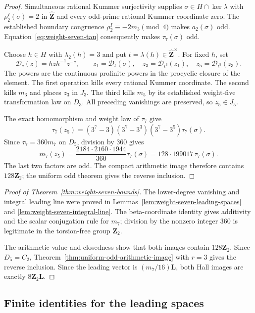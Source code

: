 \begin{proof}
Simultaneous rational Kummer surjectivity supplies
$\sigma\in H\cap\ker\lambda$ with $\rho_2^I(\sigma)=2$ in
$\widehat{\mathbf Z}$ and every odd-prime rational Kummer coordinate
zero. The established boundary congruence
$\rho_2^I\equiv-2m_3\pmod4$ makes $a_2(\sigma)$ odd.
Equation~\eqref{eq:weight-seven-tau} consequently makes
$\tau_7(\sigma)$ odd.

Choose $h\in H$ with $\lambda_2(h)=3$ and put
$t=\lambda(h)\in\widehat{\mathbf Z}^{\times}$. For fixed $h$, set
\[
 \mathcal D_c(z)=hzh^{-1}z^{-c},\qquad
 z_1=\mathcal D_t(\sigma),\quad
 z_3=\mathcal D_{t^3}(z_1),\quad
 z_5=\mathcal D_{t^5}(z_3).
\]
The powers are the continuous profinite powers in the procyclic
closure of the element. The first operation kills every rational
Kummer coordinate. The second kills $m_3$ and places $z_3$ in $J_3$.
The third kills $m_5$ by its established weight-five transformation
law on $D_3$. All preceding vanishings are preserved, so $z_5\in J_5$.

The exact homomorphism and weight law of $\tau_7$ give
\[
 \tau_7(z_5)=(3^7-3)(3^7-3^3)(3^7-3^5)\tau_7(\sigma).
\]
Since $\tau_7=360m_7$ on $D_5$, division by $360$ gives
\[
 m_7(z_5)=\frac{2184\cdot2160\cdot1944}{360}\tau_7(\sigma)
         =128\cdot199017\,\tau_7(\sigma).
\]
The last two factors are odd. The compact arithmetic image
therefore contains $128\mathbf Z_2$; the uniform odd theorem
gives the reverse inclusion.
\end{proof}

\begin{proof}[Proof of Theorem~\ref{thm:weight-seven-bounds}]
The lower-degree vanishing and integral leading line were proved in
Lemmas~\ref{lem:weight-seven-leading-spaces} and
\ref{lem:weight-seven-integral-line}. The beta-coordinate identity
gives additivity and the scalar conjugation rule for $m_7$; division
by the nonzero integer $360$ is legitimate in the torsion-free group
$\mathbf Z_2$.

The arithmetic value and closedness show that both images contain
$128\mathbf Z_2$. Since $D_5=C_2$,
Theorem~\ref{thm:uniform-odd-arithmetic-image} with $r=3$ gives
the reverse inclusion. Since the leading vector is
$(m_7/16)\mathbf L$, both Hall images are exactly
$8\mathbf Z_2\mathbf L$.
\end{proof}

\subsection{Finite identities for the leading spaces}
\label{subsec:weight-seven-leading-certificate}

